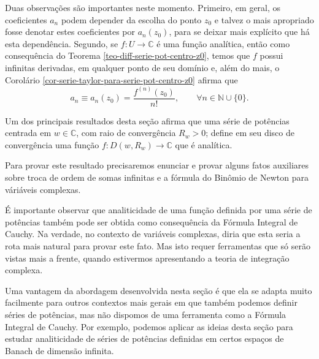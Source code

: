 Duas observações são importantes neste momento. Primeiro, em geral, 
os coeficientes $a_n$ podem depender da escolha do ponto $z_0$
e talvez o mais apropriado fosse denotar estes coeficientes por $a_n(z_0)$,
para se deixar mais explícito que há esta dependência.
Segundo, se $f:U\to\mathbb{C}$ é uma função analítica, então 
como consequência do Teorema \ref{teo-diff-serie-pot-centro-z0}, 
temos que $f$ possui infinitas derivadas, 
em qualquer ponto de seu domínio e, além do mais, o 
Corolário \ref{cor-serie-taylor-para-serie-pot-centro-z0} afirma que 
\[
a_n \equiv a_n(z_0) = \frac{f^{(n)}(z_0)}{n!}, \qquad \forall n\in\mathbb{N}\cup\{0\}.
\]


Um dos principais resultados desta seção afirma 
que uma série de potências centrada em $w\in\mathbb{C}$, 
com raio de convergência $R_{w}>0$; 
define em seu disco de convergência uma função 
$f:D(w,R_{w})\to\mathbb{C}$ que é analítica. 

Para provar este resultado precisaremos 
enunciar e provar alguns fatos auxiliares sobre troca de ordem de
somas infinitas e a fórmula do Binômio de Newton para váriáveis complexas. 

É importante observar que analiticidade de uma função definida por 
uma série de potências também pode ser obtida 
como consequência da Fórmula Integral de Cauchy. 
Na verdade, no contexto de variáveis complexas, diria que esta
seria a rota mais natural para provar este fato. 
Mas isto requer ferramentas que só serão vistas mais a frente, 
quando estivermos apresentando a teoria de integração complexa. 

Uma vantagem da abordagem desenvolvida nesta seção é que ela se adapta
muito facilmente para outros contextos mais gerais 
em que também podemos definir séries de potências, mas não dispomos
de uma ferramenta como a Fórmula Integral de Cauchy.
Por exemplo, podemos aplicar as ideias desta seção 
para estudar analiticidade de séries de potências definidas
em certos espaços de Banach de dimensão infinita. 

